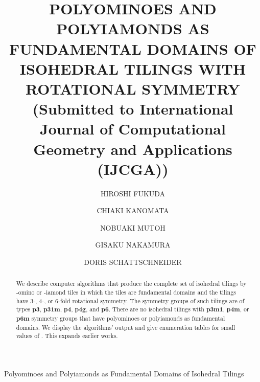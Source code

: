 \documentclass{ws-ijcga}
\begin{document}
{Polyominoes and Polyiamonds as Fundamental Domains of Isohedral Tilings
}

\catchline

\title{
POLYOMINOES AND POLYIAMONDS AS FUNDAMENTAL DOMAINS OF ISOHEDRAL TILINGS
WITH ROTATIONAL SYMMETRY
(Submitted to International Journal of Computational Geometry and Applications (IJCGA))
}


\author{HIROSHI FUKUDA
}

\address{
College of Liberal Arts and Sciences, Kitasato University, 1-15-1 Kitasato, Sagamihara,
Kanagawa 252-0373, JAPAN\\
fukuda@kitasato-u.ac.jp
}

\author{CHIAKI KANOMATA}

\address{
School of Administration and Informatics, University of Shizuoka, 52-1 Yada, Shizuoka 422-8526 JAPAN
}

\author{NOBUAKI MUTOH}

\address{
School of Administration and Informatics, University of Shizuoka, 52-1 Yada, Shizuoka 422-8526 JAPAN\\
muto@u-shizuoka-ken.ac.jp
}

\author{GISAKU NAKAMURA}

\address{
School of Administration and Informatics, University of Shizuoka, 52-1 Yada, Shizuoka 422-8526 JAPAN
}

\author{DORIS SCHATTSCHNEIDER}

\address{
Mathematics Dept. PPHAC Moravian College, 1200 Main St. Bethlehem, PA 18018-6650\\
schattdo@moravian.edu
}

\maketitle


\begin{abstract}
We describe computer algorithms that produce the complete set of isohedral tilings by
-omino or -iamond tiles in which the tiles are fundamental domains and the tilings have 3-, 4-,
or 6-fold rotational symmetry. 
The symmetry groups of such tilings are of types {\bf p3}, {\bf p31m}, {\bf p4},
{\bf p4g}, and {\bf p6}. 
There are no isohedral tilings with {\bf p3m1}, {\bf p4m}, or {\bf p6m} symmetry groups that have
polyominoes or polyiamonds as fundamental domains. 
We display the algorithms' output and give
enumeration tables for small values of . 
This expands earlier works.\cite{fukuda2006,fukuda2008} 
\end{abstract}
\end{document}
